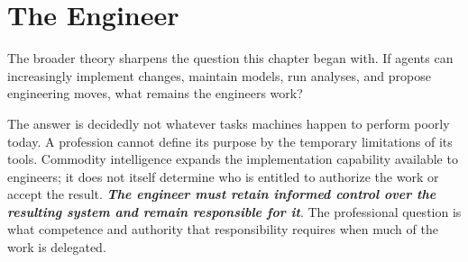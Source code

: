 


\chapter{The Engineer}

The broader theory sharpens the question this chapter began with. If agents can increasingly implement changes, maintain models, run analyses, and propose engineering moves, what remains the engineer\textquotesingle s work?


The answer is decidedly not whatever tasks machines happen to perform poorly today. A profession cannot define its purpose by the temporary limitations of its tools. Commodity intelligence expands the implementation capability available to engineers; it does not itself determine who is entitled to authorize the work or accept the result. \textbf{\emph{The engineer must retain informed control over the resulting system and remain responsible for it}}. The professional question is what competence and authority that responsibility requires when much of the work is delegated.


